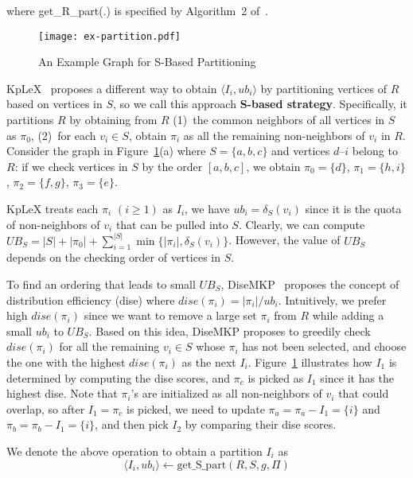 \documentclass[sigconf, nonacm]{acmart}
\begin{document}
\noindent where get\_R\_part(.) is specified by Algorithm~2 of~\cite{seesaw}.

\begin{figure}[t]
  \texttt{[image: ex-partition.pdf]}
  \vspace{-6mm}
  \caption{An Example Graph for S-Based Partitioning}\label{fig:ex-partition}
\end{figure}

\vspace{1mm}
 KpLeX~\cite{KpLeX-MKP} proposes a different way to obtain $\langle I_i, ub_i\rangle$ by partitioning vertices of $R$ based on vertices in $S$, so we call this approach {\bf S-based strategy}. Specifically, it partitions $R$ by obtaining from $R$ (1)~the common neighbors of all vertices in $S$ as $\pi_0$, (2)~for each $v_i\in S$, obtain $\pi_i$ as all the remaining non-neighbors of $v_i$ in $R$. 
%
Consider the graph in Figure~\ref{fig:ex-partition}(a) where $S=\{a, b, c\}$ and vertices $d$--$i$ belong to $R$: if we check vertices in $S$ by the order $[a, b, c]$, we obtain $\pi_0=\{d\}$, $\pi_1=\{h, i\}$, $\pi_2=\{f, g\}$, $\pi_3=\{e\}$.

KpLeX treats each $\pi_i$ $(i\geq 1)$ as $I_i$, we have $ub_i=\delta_S(v_i)$ since it is the quota of non-neighbors of $v_i$ that can be pulled into $S$. Clearly, we can compute $UB_S=|S|+|\pi_0|+\sum_{i=1}^{|S|}\min\{|\pi_i|,\delta_S(v_i)\}$. However, the value of $UB_S$ depends on the checking order of vertices in $S$.

To find an ordering that leads to small $UB_S$, DiseMKP~\cite{DiseMKP} proposes the concept of distribution efficiency (dise) where $dise(\pi_i)=|\pi_i|/ub_i$. Intuitively, we prefer high $dise(\pi_i)$ since we want to remove a large set $\pi_i$ from $R$ while adding a small $ub_i$ to $UB_S$. Based on this idea, DiseMKP proposes to greedily check $dise(\pi_i)$ for all the remaining $v_i\in S$ whose $\pi_i$ has not been selected, and choose the one with the highest $dise(\pi_i)$ as the next $I_i$. Figure~\ref{fig:ex-partition} illustrates how $I_1$ is determined by computing the dise scores, and $\pi_c$ is picked as $I_1$ since it has the highest dise. Note that $\pi_i$'s are initialized as all non-neighbors of $v_i$ that could overlap, so after $I_1=\pi_c$ is picked, we need to update $\pi_a=\pi_a-I_1=\{i\}$ and  $\pi_b=\pi_b-I_1=\{i\}$, and then pick $I_2$ by comparing their dise scores.

We denote the above operation to obtain a partition $I_i$ as
\vspace{-1mm}
$$\langle I_i, ub_i\rangle\gets \text{get\_S\_part}(R, S, g, \Pi)$$
\vspace{-4mm}
\end{document}
